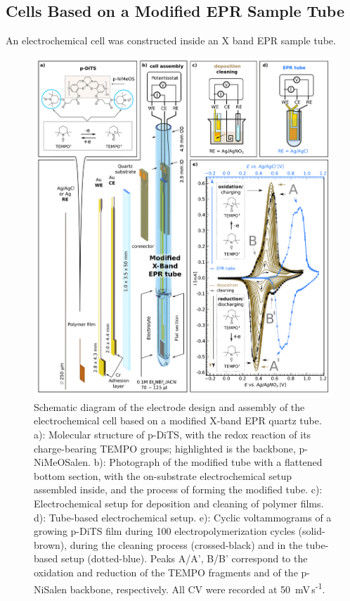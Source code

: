 \subsection{Cells Based on a Modified EPR Sample Tube}
\label{sec:tube_cell}
An electrochemical cell was constructed inside an X band EPR sample tube.
\begin{figure}[ht]
 \centering
 \includegraphics[width=0.99\textwidth]{./operando_epr/figures/Flat_tube_setup.pdf}
 \caption{Schematic diagram of the electrode design and assembly of the electrochemical cell based on a modified X-band EPR quartz tube. a): Molecular structure of p-DiTS, with the redox reaction of its charge-bearing TEMPO groups; highlighted is the backbone, p-NiMeOSalen. b): Photograph of the modified tube with a flattened bottom section, with the on-substrate electrochemical setup assembled inside, and the process of forming the modified tube. c): Electrochemical setup for deposition and cleaning of polymer films. d): Tube-based electrochemical setup. e): Cyclic voltammograms of a growing p-DiTS film during 100 electropolymerization cycles (solid-brown), during the cleaning process (crossed-black) and in the tube-based setup (dotted-blue). Peaks A/A', B/B' correspond to the oxidation and reduction of the TEMPO fragments and of the p-NiSalen backbone, respectively. All CV were recorded at 50~mV\,s\textsuperscript{-1}.}
 \label{fig:flat_tube}
\end{figure}

